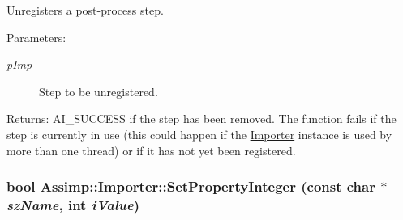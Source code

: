 Unregisters a post-process step.

\begin{Desc}
\item[Parameters:]
\begin{description}
\item[{\em pImp}]Step to be unregistered. \end{description}
\end{Desc}
\begin{Desc}
\item[Returns:]AI\_\-SUCCESS if the step has been removed. The function fails if the step is currently in use (this could happen if the \hyperlink{class_assimp_1_1_importer_2c207299ed05f1db1ad1e6dab005f719}{Importer} instance is used by more than one thread) or if it has not yet been registered. \end{Desc}
\hypertarget{class_assimp_1_1_importer_2542eed3d5f491025c4095b4e55fa068}{
\subsubsection[SetPropertyInteger]{\setlength{\rightskip}{0pt plus 5cm}bool Assimp::Importer::SetPropertyInteger (const char $\ast$ {\em szName}, \/  int {\em iValue})}}
\label{class_assimp_1_1_importer_2542eed3d5f491025c4095b4e55fa068}



